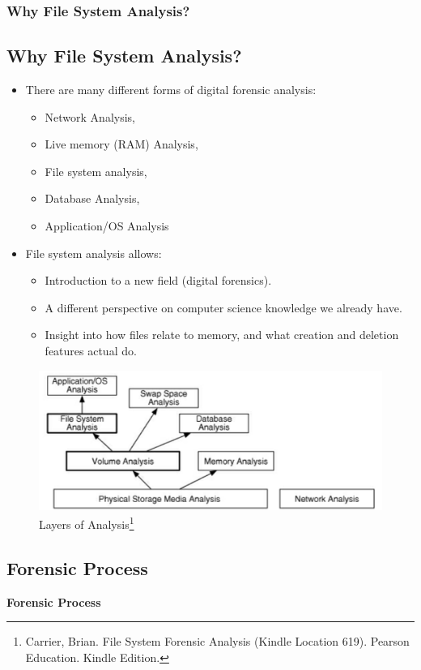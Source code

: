 \documentclass{beamer}
\begin{document}
\begin{frame}[allowframebreaks]
	\frametitle{Why File System Analysis?}
	\subsection*{Why File System Analysis?}
	\begin{itemize}
		\item There are many different forms of digital forensic analysis:
			\begin{itemize}
				\item Network Analysis,
				\item Live memory (RAM) Analysis, 
				\item File system analysis, 
				\item Database Analysis,
				\item Application/OS Analysis
			\end{itemize}
			\item File system analysis allows:
			\begin{itemize}
				\item Introduction to a new field (digital forensics).
				\item A different perspective on computer science knowledge we already have.
				\item Insight into how files relate to memory, and what creation and deletion features actual do.
			\end{itemize}
	\end{itemize}
	\begin{figure}
		\includegraphics[scale=0.3]{digital-data-analysis-layers-BrianCarrier}
		\caption{Layers of Analysis\footnote{Carrier, Brian. File System Forensic Analysis (Kindle Location 619). Pearson Education. Kindle Edition.}} 

	\end{figure}
\end{frame}

\begin{frame}%
	\section{Forensic Process}
	\begin{center}
		\Huge\textbf{Forensic Process}
	\end{center}
\end{frame}
\end{document}
